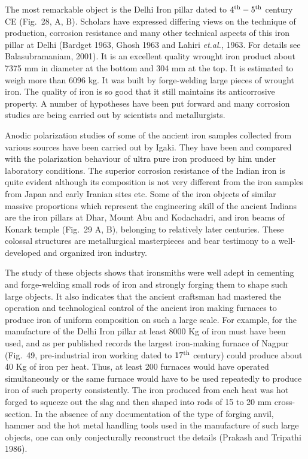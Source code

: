 The most remarkable object is the Delhi Iron pillar dated to $4^{\rm th} -5^{\rm th}$ century CE (Fig.~28, A, B). Scholars have expressed differing views on the technique of production, corrosion resistance and many other technical aspects of this iron pillar at Delhi (Bardget 1963, Ghosh 1963 and Lahiri {\it et.al.}, 1963. For details see Balasubramaniam, 2001). It is an excellent quality wrought iron product about 7375 mm in diameter at the bottom and 304 mm at the top. It is estimated to weigh more than 6096 kg. It was built by forge-welding large pieces of wrought iron. The quality of iron is so good that it still maintains its anticorrosive property. A number of hypotheses have been put forward and many corrosion studies are being carried out by scientists and metallurgists. 

Anodic polarization studies of some of the ancient iron samples collected from various sources have been carried out by Igaki. They have been and compared with the polarization behaviour of ultra pure iron produced by him under laboratory conditions. The superior corrosion resistance of the Indian iron is quite evident although its composition is not very different from the iron samples from Japan and early Iranian sites etc. Some of the iron objects of similar massive proportions which represent the engineering skill of the ancient Indians are the iron pillars at Dhar, Mount Abu and Kodachadri, and iron beams of Konark temple (Fig.~29 A, B), belonging to relatively later centuries. These colossal structures are metallurgical masterpieces and bear testimony to a well-developed and organized iron industry.

The study of these objects shows that ironsmiths were well adept in cementing and forge-welding small rods of iron and strongly forging them to shape such large objects. It also indicates that the ancient craftsman had mastered the operation and technological control of the ancient iron making furnaces to produce iron of uniform composition on such a large scale. For example, for the manufacture of the Delhi Iron pillar at least 8000 Kg of iron must have been used, and as per published records the largest iron-making furnace of Nagpur (Fig.~49, pre-industrial iron working dated to $17^{\rm th}$ century) could produce about 40 Kg of iron per heat. Thus, at least 200 furnaces would have operated simultaneously or the same furnace would have to be used repeatedly to produce iron of such property consistently. The iron produced from each heat was hot forged to squeeze out the slag and then shaped into rods of 15 to 20 mm cross-section. In the absence of any documentation of the type of forging anvil, hammer and the hot metal handling tools used in the manufacture of such large objects, one can only conjecturally reconstruct the details (Prakash and Tripathi 1986). 

